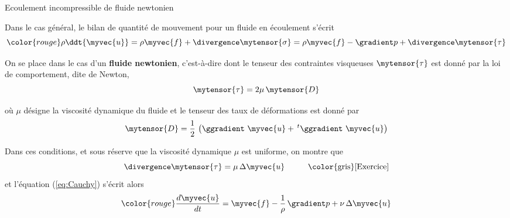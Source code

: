 




%


\begin{frame}{Ecoulement incompressible de fluide newtonien}

\small

Dans le cas général, le bilan de quantité de mouvement pour un fluide en écoulement s'écrit
\begin{equation}
	\color{rouge}
	\rho \ddt{\myvec{u}} 
	= \rho \myvec{f} + \divergence \mytensor{\sigma}
	= \rho \myvec{f} - \gradient p + \divergence \mytensor{\tau}
	\label{eq:Cauchy}
\end{equation}

\pause

On se place dans le cas d'un \textbf{fluide newtonien}, c'est-à-dire dont le tenseur des contraintes
visqueuses $\mytensor{\tau}$ est donné par la loi de comportement, dite de Newton,
\[
	\mytensor{\tau} = 2 \mu \, \mytensor{D}
\] 

où $\mu$ désigne la viscosité dynamique du fluide et le tenseur des taux de déformations est donné par
\[
	\mytensor{D} = \frac{1}{2}\, \left ( \ggradient\ \myvec{u} + \,^t\ggradient\ \myvec{u} \right )
\] 

\pause
Dans ces conditions, et sous réserve que la viscosité dynamique $\mu$ est uniforme, on montre que
\[
	\divergence \mytensor{\tau} = \mu\, \Delta \myvec{u}
	\hspace{10mm} \mbox{\color{gris} [Exercice]}
\]
\pause
et l'équation (\ref{eq:Cauchy}) s'écrit alors
\begin{equation*}
	\color{rouge}
	\frac{d\myvec{u}}{dt} 
	=
	\myvec{f}
	-
	\frac{1}{\rho} \, \gradient p
	+
	\nu \, \Delta \myvec{u} 
\end{equation*}

\vspace{5mm}

\end{frame}


